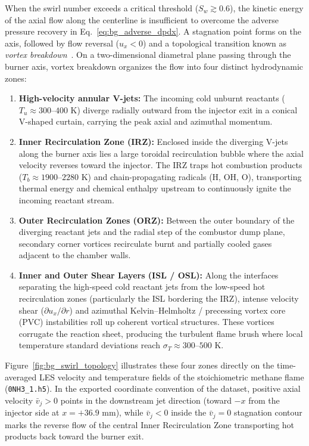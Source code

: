 When the swirl number exceeds a critical threshold ($S_w \gtrsim 0.6$), the kinetic energy of the axial flow along the centerline is insufficient to overcome the adverse pressure recovery in Eq.~\eqref{eq:bg_adverse_dpdx}. A stagnation point forms on the axis, followed by flow reversal ($u_x < 0$) and a topological transition known as \emph{vortex breakdown}~\cite{syred1974combustion, candel2014dynamics}. On a two-dimensional diametral plane passing through the burner axis, vortex breakdown organizes the flow into four distinct hydrodynamic zones:
\begin{enumerate}
    \item \textbf{High-velocity annular V-jets:} The incoming cold unburnt reactants ($T_u \approx 300\text{--}400\text{ K}$) diverge radially outward from the injector exit in a conical V-shaped curtain, carrying the peak axial and azimuthal momentum.
    \item \textbf{Inner Recirculation Zone (IRZ):} Enclosed inside the diverging V-jets along the burner axis lies a large toroidal recirculation bubble where the axial velocity reverses toward the injector. The IRZ traps hot combustion products ($T_b \approx 1900\text{--}2280\text{ K}$) and chain-propagating radicals ($\text{H}$, $\text{OH}$, $\text{O}$), transporting thermal energy and chemical enthalpy upstream to continuously ignite the incoming reactant stream.
    \item \textbf{Outer Recirculation Zones (ORZ):} Between the outer boundary of the diverging reactant jets and the radial step of the combustor dump plane, secondary corner vortices recirculate burnt and partially cooled gases adjacent to the chamber walls.
    \item \textbf{Inner and Outer Shear Layers (ISL / OSL):} Along the interfaces separating the high-speed cold reactant jets from the low-speed hot recirculation zones (particularly the ISL bordering the IRZ), intense velocity shear ($\partial u_x / \partial r$) and azimuthal Kelvin--Helmholtz / precessing vortex core (PVC) instabilities roll up coherent vortical structures. These vortices corrugate the reaction sheet, producing the turbulent flame brush where local temperature standard deviations reach $\sigma_T \approx 300\text{--}500\text{ K}$.
\end{enumerate}

Figure~\ref{fig:bg_swirl_topology} illustrates these four zones directly on the time-averaged LES velocity and temperature fields of the stoichiometric methane flame (\texttt{0NH3\_1.h5}). In the exported coordinate convention of the dataset, positive axial velocity $\bar{v}_j > 0$ points in the downstream jet direction (toward $-x$ from the injector side at $x = +36.9\text{ mm}$), while $\bar{v}_j < 0$ inside the $\bar{v}_j = 0$ stagnation contour marks the reverse flow of the central Inner Recirculation Zone transporting hot products back toward the burner exit.

